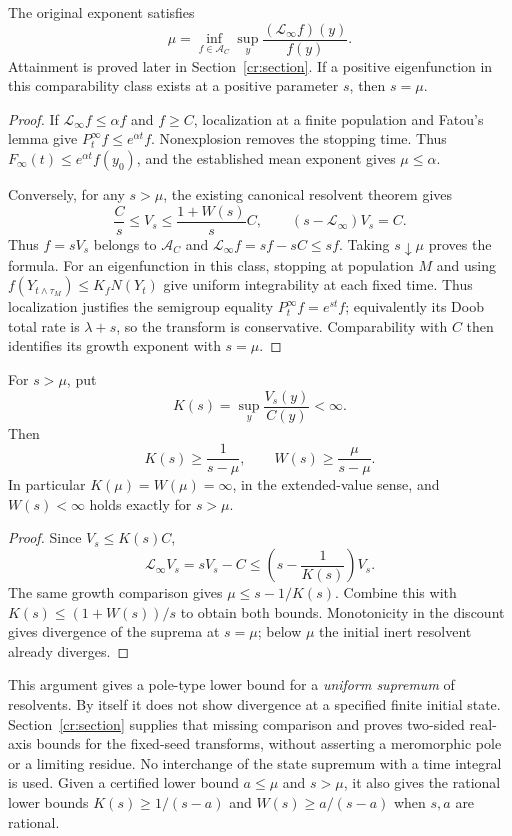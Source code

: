 \begin{theorem}
\label{pm:variational}
The original exponent satisfies
\[
 \boxed{\displaystyle
 \mu=\inf_{f\in\mathcal A_C}\sup_y
                  \frac{(\mathcal L_\infty f)(y)}{f(y)}.}
\]
Attainment is proved later in Section~\ref{cr:section}.  If a positive eigenfunction
in this comparability class exists at a positive parameter $s$, then
$s=\mu$.
\end{theorem}
\begin{proof}
If $\mathcal L_\infty f\le\alpha f$ and $f\ge C$, localization
at a finite population and Fatou's lemma give
$P_t^\infty f\le e^{\alpha t}f$.  Nonexplosion removes the stopping
time.  Thus $F_\infty(t)\le e^{\alpha t}f(y_0)$, and the established
mean exponent gives $\mu\le\alpha$.

Conversely, for any $s>\mu$, the existing canonical resolvent theorem
gives
\[
 \frac{C}{s}\le V_s\le\frac{1+W(s)}s C,
 \qquad (s-\mathcal L_\infty)V_s=C.
\]
Thus $f=sV_s$ belongs to $\mathcal A_C$ and
$\mathcal L_\infty f=sf-sC\le sf$.  Taking $s\downarrow\mu$
proves the formula.  For an eigenfunction in this class, stopping at
population $M$ and using $f(Y_{t\wedge\tau_M})\le K_fN(Y_t)$
give uniform integrability at each fixed time.  Thus localization
justifies the semigroup equality $P_t^\infty f=e^{st}f$;
equivalently its Doob total rate
is $\lambda+s$, so the transform is conservative.  Comparability
with $C$ then identifies its growth exponent with $s=\mu$.
\end{proof}

\begin{corollary}
\label{pm:uniform-pole}
For $s>\mu$, put
\[
 K(s)=\sup_y\frac{V_s(y)}{C(y)}<\infty.
\]
Then
\[
 \boxed{\displaystyle
 K(s)\ge\frac1{s-\mu},\qquad
 W(s)\ge\frac{\mu}{s-\mu}.}
\]
In particular $K(\mu)=W(\mu)=\infty$, in the extended-value sense,
and $W(s)<\infty$ holds exactly for $s>\mu$.
\end{corollary}
\begin{proof}
Since $V_s\le K(s)C$,
\[
 \mathcal L_\infty V_s=sV_s-C
 \le\left(s-\frac1{K(s)}\right)V_s.
\]
The same growth comparison gives $\mu\le s-1/K(s)$.
Combine this with $K(s)\le(1+W(s))/s$ to obtain both bounds.
Monotonicity in the discount gives divergence of the suprema at
$s=\mu$; below $\mu$ the initial inert resolvent already diverges.
\end{proof}

This argument gives a pole-type lower bound for a \emph{uniform supremum}
of resolvents. By itself it does not show divergence at a specified
finite initial state. Section~\ref{cr:section} supplies that missing
comparison and proves two-sided real-axis bounds for the fixed-seed
transforms, without asserting a meromorphic pole or a limiting residue.
No interchange of the
state supremum with a time integral is used.  Given a certified lower
bound $a\le\mu$ and $s>\mu$, it also gives the rational lower bounds
$K(s)\ge1/(s-a)$ and $W(s)\ge a/(s-a)$ when $s,a$ are rational.
